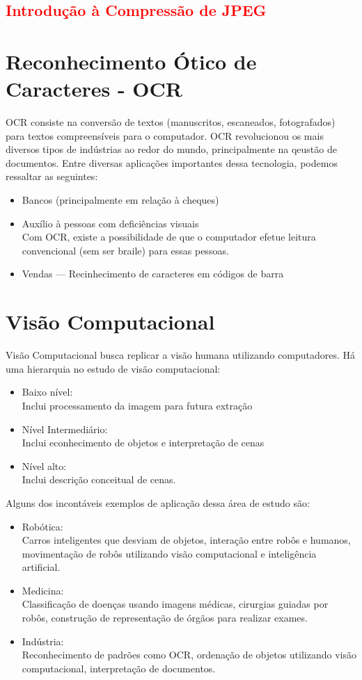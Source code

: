 \documentclass[a4paper, 12pt]{article}
\begin{document}
\textcolor{red}{
\section{Introdução à Compressão de JPEG}}

\section{Reconhecimento Ótico de Caracteres - OCR}
OCR consiste na conversão de textos (manuscritos, escaneados, fotografados) para textos compreensíveis para o computador. OCR revolucionou os mais 
diversos tipos de indústrias ao redor do mundo, principalmente na qeustão de documentos. Entre diversas aplicações importantes dessa tecnologia, 
podemos ressaltar as seguintes:
\begin{itemize}
	\item Bancos (principalmente em relação à cheques)
 \item Auxílio à pessoas com deficiências visuais
 \\
 Com OCR, existe a possibilidade de que o computador efetue leitura convencional (sem ser braile) para essas pessoas.

 \item Vendas --- Recinhecimento de caracteres em códigos de barra
\end{itemize}

\section{Visão Computacional}
Visão Computacional busca replicar a visão humana utilizando computadores. Há uma hierarquia no estudo de visão computacional:
\begin{itemize}
	\item Baixo nível:
	\\
	Inclui processamento da imagem para futura extração
	\item Nível Intermediário:
 	\\
	Inclui econhecimento de objetos e interpretação de cenas
	\item Nível alto:
 	\\
	Inclui descrição conceitual de cenas.
\end{itemize}
Alguns dos incontáveis exemplos de aplicação dessa área de estudo são:
\begin{itemize}
	\item Robótica:
 	\\
	Carros inteligentes que desviam de objetos, interação entre robôs e humanos, movimentação de robôs utilizando visão computacional e inteligência 
	artificial.
	\item Medicina:
	\\
	Classificação de doenças usando imagens médicas, cirurgias guiadas por robôs, construção de representação de órgãos para realizar exames.
	\item Indústria:
	\\
	Reconhecimento de padrões como OCR, ordenação de objetos utilizando visão computacional, interpretação de documentos.
\end{itemize}
\end{document}
